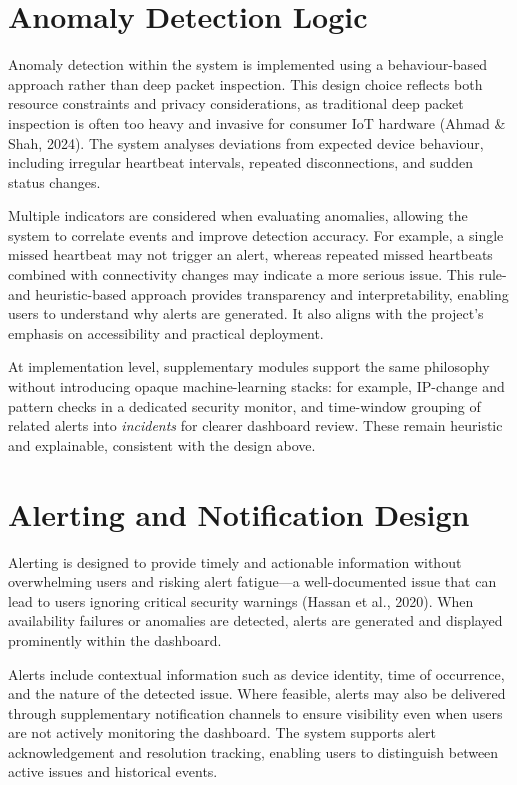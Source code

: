 \section{Anomaly Detection Logic}

Anomaly detection within the system is implemented using a behaviour-based approach rather than deep packet inspection. This design choice reflects both resource constraints and privacy considerations, as traditional deep packet inspection is often too heavy and invasive for consumer IoT hardware (Ahmad \& Shah, 2024). The system analyses deviations from expected device behaviour, including irregular heartbeat intervals, repeated disconnections, and sudden status changes.

Multiple indicators are considered when evaluating anomalies, allowing the system to correlate events and improve detection accuracy. For example, a single missed heartbeat may not trigger an alert, whereas repeated missed heartbeats combined with connectivity changes may indicate a more serious issue. This rule- and heuristic-based approach provides transparency and interpretability, enabling users to understand why alerts are generated. It also aligns with the project's emphasis on accessibility and practical deployment.

At implementation level, supplementary modules support the same philosophy without introducing opaque machine-learning stacks: for example, IP-change and pattern checks in a dedicated security monitor, and time-window grouping of related alerts into \emph{incidents} for clearer dashboard review. These remain heuristic and explainable, consistent with the design above.

\section{Alerting and Notification Design}

Alerting is designed to provide timely and actionable information without overwhelming users and risking alert fatigue---a well-documented issue that can lead to users ignoring critical security warnings (Hassan et al., 2020). When availability failures or anomalies are detected, alerts are generated and displayed prominently within the dashboard.

Alerts include contextual information such as device identity, time of occurrence, and the nature of the detected issue. Where feasible, alerts may also be delivered through supplementary notification channels to ensure visibility even when users are not actively monitoring the dashboard. The system supports alert acknowledgement and resolution tracking, enabling users to distinguish between active issues and historical events.


